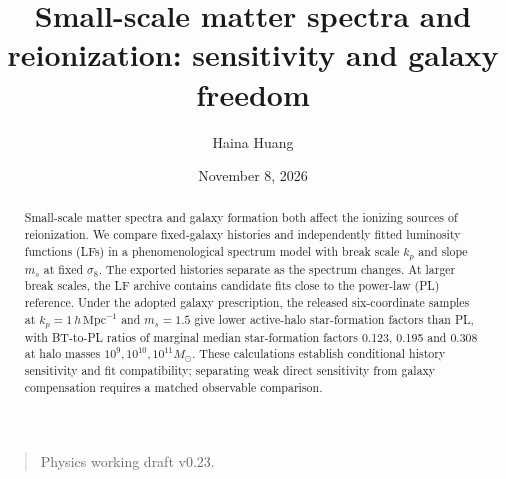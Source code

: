 \documentclass[reprint,superscriptaddress,nofootinbib,nobibnotes,amsmath,amssymb,aps,prd,floatfix,longbibliography]{revtex4-2}
\def\btemubody{body.tex}
\begin{document}
\title{Small-scale matter spectra and reionization: sensitivity and galaxy freedom}
\author{Haina Huang}
\date{November 8, 2026}
\begin{abstract}
Small-scale matter spectra and galaxy formation both affect the ionizing sources of reionization. We compare fixed-galaxy histories and independently fitted luminosity functions (LFs) in a phenomenological spectrum model with break scale $k_p$ and slope $m_s$ at fixed $\sigma_8$. The exported histories separate as the spectrum changes. At larger break scales, the LF archive contains candidate fits close to the power-law (PL) reference. Under the adopted galaxy prescription, the released six-coordinate samples at $k_p=1\,h\,\mathrm{Mpc}^{-1}$ and $m_s=1.5$ give lower active-halo star-formation factors than PL, with BT-to-PL ratios of marginal median star-formation factors 0.123, 0.195 and 0.308 at halo masses $10^9,10^{10},10^{11}M_\odot$. These calculations establish conditional history sensitivity and fit compatibility; separating weak direct sensitivity from galaxy compensation requires a matched observable comparison.
\end{abstract}
\maketitle
\begin{quote}\small Physics working draft v0.23.\end{quote}

\end{document}
